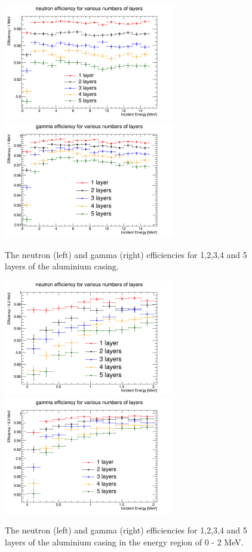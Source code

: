 \begin{figure}[htbp]
\begin{center}
\includegraphics[width=75mm]{Chapter6/figures/neutronAlLayersEfficiency0-16MeV.png}
\includegraphics[width=75mm]{Chapter6/figures/gammaAlLayersEfficiency0-16MeV.png}
\caption{The neutron (left) and gamma (right) efficiencies for 1,2,3,4 and 5 layers of the aluminium casing.}
\label{fig:efficienciesAlLayers}
\end{center}
\end{figure}

\begin{figure}[htbp]
\begin{center}
\includegraphics[width=75mm]{Chapter6/figures/neutronAlLayersEfficiency0-2MeV.png}
\includegraphics[width=75mm]{Chapter6/figures/gammaAlLayersEfficiency0-2MeV.png}
\caption{The neutron (left) and gamma (right) efficiencies for 1,2,3,4 and 5 layers of the aluminium casing in the energy region of 0 - 2 MeV.}
\label{fig:efficienciesAlLayersZoom}
\end{center}
\end{figure}

